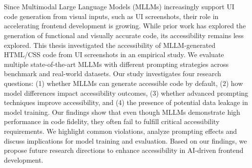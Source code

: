 \chapter{\abstractname}


Since Multimodal Large Language Models (MLLMs) increasingly support 
UI code generation from visual inputs, such as UI screenshots, their role 
in accelerating frontend development is growing. While prior work 
has explored the generation of functional and visually accurate code,
its accessibility remains less explored. This thesis 
investigated the accessibility of MLLM-generated HTML/CSS code from 
UI screenshots in an empirical study. We evaluate multiple 
state-of-the-art MLLMs with different prompting strategies 
across benchmark and real-world datasets. Our study investigates 
four research questions: (1) whether MLLMs can generate accessible 
code by default, (2) how model differences impact accessibility 
outcomes, (3) whether advanced prompting techniques improve 
accessibility, and (4) the presence of potential data leakage
in model training. Our findings show that even though MLLMs demonstrate 
high performance in code fidelity, they often fail to fulfill 
critical accessibility requirements. We highlight common violations,
analyze prompting effects and discuss implications for model training
and evaluation. Based on our findings, we propose future research 
directions to enhance accessibility in AI-driven frontend development.